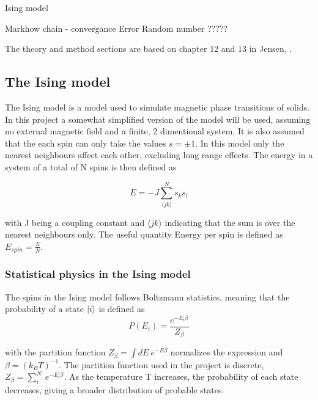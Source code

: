 

Ising model

Markhow chain - convergance
Error
Random number ?????

The theory and method sections are based on chapter 12 and 13 in Jensen, \cite{Jensen}.
\subsection{The Ising model}

The Ising model is a model used to simulate magnetic phase transitions of solids. In this project a somewhat simplified version of the model will be used, assuming no external magnetic field and a finite, 2 dimentional system. It is also assumed that the each spin can only take the values $ s  = \pm 1$.  In this model only the nearest neighbours affect each other, excluding long range effects. The energy in a system of a total of N spins is then defined as

\begin{equation}\label{eq: Energy_Ising}
E = -J \sum\limits_{\langle jk \rangle }^{N} s_ks_l
\end{equation}

with J being a coupling constant and  $ \langle jk \rangle $ indicating that the sum is over the nearest neighbours only. The useful quantity Energy per spin is defined as $ E_{spin}  = \frac{E}{N}$. 


\subsubsection{Statistical physics in the Ising model}

The spins in the Ising model follows Boltzmann statistics, meaning that the probability of a state $\ket{i}$ is defined as 
\begin{equation}\label{eq:boltzmann}
P(E_i) = \frac{e^{-E_i\beta}}{Z_{\beta}} 
\end{equation}

with the partition function $ Z_{\beta} = \int dE \ e^{-E\beta} $ normalizes the expression and $ \beta = (k_BT)^{-1} $. The partition function used in the project is discrete,$ Z_{\beta} = \sum\limits_{i}^{N} \ e^{-E_i\beta} $. As the temperature T increases, the probability of each state decreases, giving a broader distribution of probable states.  

